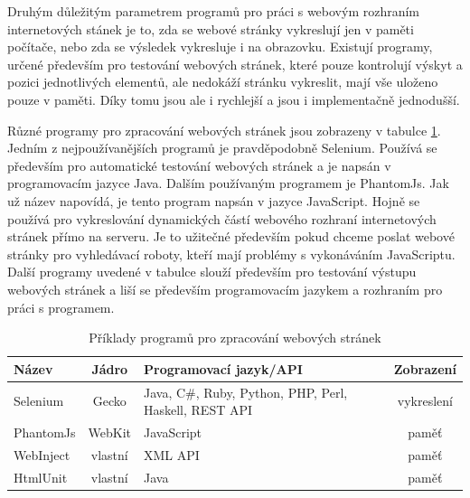 \documentclass[thesis=M,czech]{FITthesis}[2013/05/10]
\begin{document}
Druhým důležitým parametrem programů pro práci s webovým rozhraním internetových stánek je to, zda se webové stránky vykreslují jen v paměti počítače, nebo zda se výsledek vykresluje i na obrazovku. Existují programy, určené především pro testování webových stránek, které pouze kontrolují výskyt a pozici jednotlivých elementů, ale nedokáží stránku vykreslit, mají vše uloženo pouze v paměti. Díky tomu jsou ale i rychlejší a jsou i implementačně jednodušší. 

Různé programy pro zpracování webových stránek jsou zobrazeny v tabulce \ref{tab:web-engines}. Jedním z nejpoužívanějších programů je pravděpodobně Selenium. Používá se především pro automatické testování webových stránek a je napsán v programovacím jazyce Java. Dalším používaným programem je PhantomJs. Jak už název napovídá, je tento program napsán v jazyce JavaScript. Hojně se používá pro vykreslování dynamických částí webového rozhraní internetových stránek přímo na serveru. Je to užitečné především pokud chceme poslat webové stránky pro vyhledávací roboty, kteří mají problémy s vykonáváním JavaScriptu. Další programy uvedené v tabulce slouží především pro testování výstupu webových stránek a liší se především programovacím jazykem a rozhraním pro práci s programem.

\begin{table}[h]
\centering
\caption{Příklady programů pro zpracování webových stránek}\label{tab:web-engines}
\begin{tabular}{| l | c | p{5cm} | c |}
	\hline
	\textbf{Název} & 
	\textbf{Jádro} & 
	\textbf{Programovací jazyk/API} & 
	\textbf{Zobrazení} \\ \hline
	
	Selenium & %
	Gecko & 
	Java, C\#, Ruby, Python, PHP, Perl, Haskell, REST API & 
	vykreslení \\ \hline
	
	PhantomJs & %
	WebKit & 
	JavaScript & 
	paměť \\ \hline
	
	WebInject & %
	vlastní &
	XML API &
	paměť \\ \hline
	
	HtmlUnit & %
	vlastní &
	Java &
	paměť \\ \hline
		
\end{tabular}
\end{table}
\end{document}
